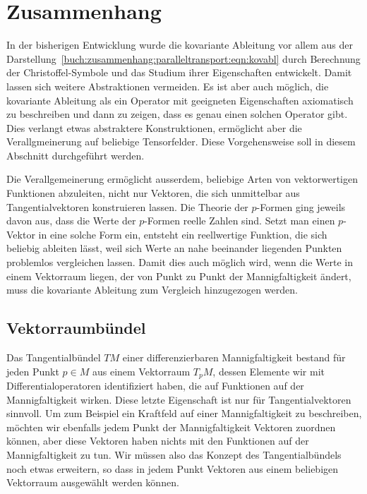 %
%
%

%
%
\section{Zusammenhang
\label{buch:zusammenhang:section:zusammenhang}}
In der bisherigen Entwicklung wurde die kovariante Ableitung vor allem
aus der Darstellung~\eqref{buch:zusammenhang:paralleltransport:eqn:kovabl}
durch Berechnung der Christoffel-Symbole und das Studium ihrer
Eigenschaften entwickelt.
Damit lassen sich weitere Abstraktionen vermeiden.
Es ist aber auch möglich, die kovariante Ableitung als ein Operator
mit geeigneten Eigenschaften axiomatisch zu beschreiben und dann zu
zeigen, dass es genau einen solchen Operator gibt.
Dies verlangt etwas abstraktere Konstruktionen, ermöglicht aber
die Verallgmeinerung auf beliebige Tensorfelder.
Diese Vorgehensweise soll in diesem Abschnitt durchgeführt werden.

Die Verallgemeinerung ermöglicht ausserdem, beliebige Arten von
vektorwertigen Funktionen abzuleiten, nicht nur Vektoren, die sich
unmittelbar aus Tangentialvektoren konstruieren lassen.
Die Theorie der $p$-Formen ging jeweils davon aus, dass die
Werte der $p$-Formen reelle Zahlen sind.
Setzt man einen $p$-Vektor in eine solche Form ein, entsteht ein
reellwertige Funktion, die sich beliebig ableiten lässt, weil
sich Werte an nahe beeinander liegenden Punkten problemlos
vergleichen lassen.
Damit dies auch möglich wird, wenn die Werte in einem Vektorraum
liegen, der von Punkt zu Punkt der Mannigfaltigkeit ändert, muss
die kovariante Ableitung zum Vergleich hinzugezogen werden.

%
%
\subsection{Vektorraumbündel}
Das Tangentialbündel $TM$ einer differenzierbaren Mannigfaltigkeit
bestand für jeden Punkt $p\in M$ aus einem Vektorraum $T_pM$, dessen
Elemente wir mit Differentialoperatoren identifiziert haben, die
auf Funktionen auf der Mannigfaltigkeit wirken.
Diese letzte Eigenschaft ist nur für Tangentialvektoren sinnvoll.
Um zum Beispiel ein Kraftfeld auf einer Mannigfaltigkeit zu beschreiben,
möchten wir ebenfalls jedem Punkt der Mannigfaltigkeit Vektoren
zuordnen können, aber diese Vektoren haben nichts mit den Funktionen
auf der Mannigfaltigkeit zu tun.
Wir müssen also das Konzept des Tangentialbündels noch etwas
erweitern, so dass in jedem Punkt Vektoren aus einem beliebigen
Vektorraum ausgewählt werden können.

